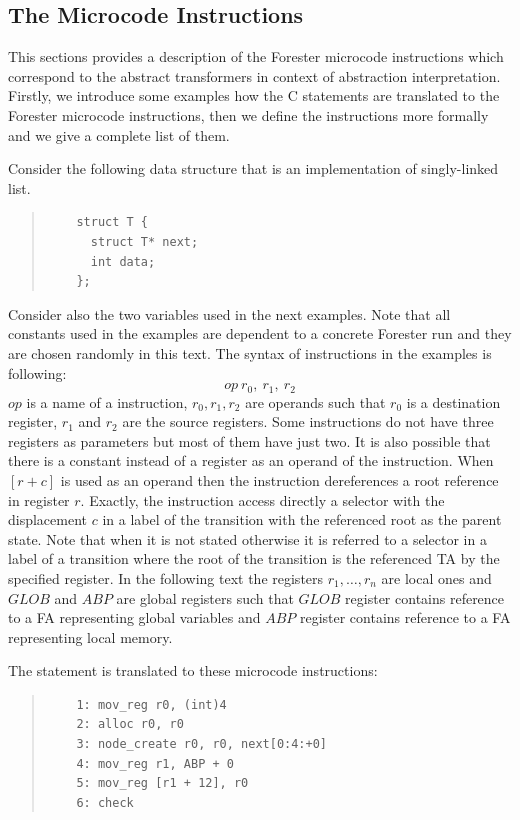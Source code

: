 \subsection{The Microcode Instructions}
\label{subsec:microinstr}

This sections provides a description of the Forester microcode instructions
which correspond to the abstract transformers in context of abstraction interpretation.
Firstly, we introduce some examples how the C statements are translated
to the Forester microcode instructions, then we define the instructions
more formally and we give a complete list of them.

Consider the following data structure that is an implementation of singly-linked list.
	\begin{quote}
	\begin{verbatim}
	struct T {
      struct T* next;
      int data;
	};

	\end{verbatim}
	\end{quote}
	
	Consider also the two variables  used in the next examples.
	Note that all constants used in the examples are dependent to a concrete Forester
	run and they are chosen randomly in this text.
	The syntax of instructions in the examples is following:
	$$ op\ r_0,\ r_1,\ r_2$$
	$op$ is a name of a instruction,
	$r_0, r_1, r_2$ are operands such that $r_0$ is a destination register,
	$r_1$ and $r_2$ are the source registers.
	Some instructions do not have three registers as parameters but most of them
	have just two.
	It is also possible that there is a constant instead of a register
	as an operand of the instruction.
	When $[r+c]$ is used as an operand then the instruction dereferences a root reference in register $r$.
	Exactly, the instruction access directly a selector with the displacement $c$ in a label of the transition with
	the referenced root as the parent state.
	Note that when it is not stated otherwise it is referred to a selector in a label of a transition
	where the root of the transition is the referenced TA by the specified register.
	In the following text the registers $r_1,\ldots,r_n$ are local ones and
	$GLOB$ and $ABP$ are global registers such that $GLOB$ register contains reference to a FA representing
	global variables and $ABP$ register contains reference to a FA representing local memory.

\bexmp
	The statement  is translated
	to these microcode instructions:
	\begin{quote}
	\begin{verbatim}
	1: mov_reg r0, (int)4
	2: alloc r0, r0
	3: node_create r0, r0, next[0:4:+0]
	4: mov_reg r1, ABP + 0
	5: mov_reg [r1 + 12], r0    
	6: check
	\end{verbatim}
	\end{quote}

